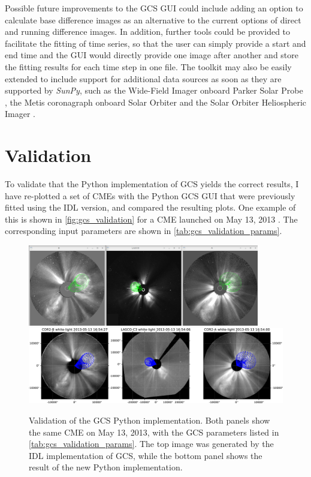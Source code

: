 Possible future improvements to the \ac{GCS} \ac{GUI} could include adding an option to calculate base difference images as an alternative to the current options of direct and running difference images. In addition, further tools could be provided to facilitate the fitting of time series, so that the user can simply provide a start and end time and the \ac{GUI} would directly provide one image after another and store the fitting results for each time step in one file. The toolkit may also be easily extended to include support for additional data sources as soon as they are supported by \textit{SunPy}, such as the Wide-Field Imager onboard Parker Solar Probe \citep[WISPR,][]{Vourlidas-2016-WISPR}, the Metis coronagraph onboard Solar Orbiter \citep{Antonucci-2020-Metis} and the Solar Orbiter Heliospheric Imager \citep[SoloHI,][]{Howard-2020-SoloHI}.

\section{Validation}

To validate that the Python implementation of \ac{GCS} yields the correct results, I have re-plotted a set of \acp{CME}  with the Python \ac{GCS} \ac{GUI} that were previously fitted using the \ac{IDL} version, and compared the resulting plots. One example of this is shown in \autoref{fig:gcs_validation} for a \ac{CME} launched on May 13, 2013 \citep[originally reconstructed by][Figure 2]{Gou-2020}. The corresponding input parameters are shown in \autoref{tab:gcs_validation_params}.

\begin{figure}
	\centering
	\includegraphics[width=0.9\textwidth]{images/gcs_validation_20130513_idl.png}\\[5mm]
	\includegraphics[width=\textwidth]{images/gcs_validation_20130513_python.pdf}
	\caption[Validation of the \acs{GCS} Python implementation]{Validation of the \ac{GCS} Python implementation. Both panels show the same \ac{CME} on May 13, 2013, with the \ac{GCS} parameters listed in \autoref{tab:gcs_validation_params}. The top image was generated by the \ac{IDL} implementation of \ac{GCS}, while the bottom panel shows the result of the new Python implementation.}
	\label{fig:gcs_validation}
\end{figure}

